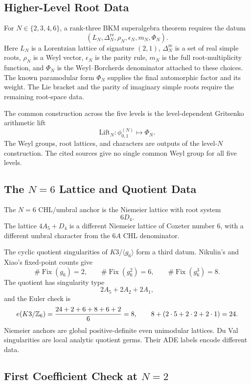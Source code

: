 \subsection*{Higher-Level Root Data}

For \(N\in\{2,3,4,6\}\), a rank-three BKM superalgebra theorem requires
the datum
\[
  (L_N,\Delta^{\mathrm{re}}_N,\rho_N,\epsilon_N,m_N,\Phi_N).
\]
Here \(L_N\) is a Lorentzian lattice of signature \((2,1)\),
\(\Delta^{\mathrm{re}}_N\) is a set of real simple roots,
\(\rho_N\) is a Weyl vector, \(\epsilon_N\) is the parity rule,
\(m_N\) is the full root-multiplicity function, and \(\Phi_N\) is the
Weyl--Borcherds denominator attached to these choices. The known
paramodular form \(\Phi_N\) supplies the final automorphic factor and
its weight. The Lie bracket and the parity of imaginary simple roots
require the remaining root-space data.

The common construction across the five levels is the level-dependent
Gritsenko arithmetic lift
\[
  \mathrm{Lift}_N:\phi^{(N)}_{0,1}\longmapsto \Phi_N .
\]
The Weyl groups, root lattices, and characters are outputs of the
level-\(N\) construction. The cited sources give no single common Weyl
group for all five levels.

\subsection*{The \(N=6\) Lattice and Quotient Data}

The \(N=6\) CHL/umbral anchor is the Niemeier lattice with root system
\[
  6D_4 .
\]
The lattice \(4A_5+D_4\) is a different Niemeier lattice of Coxeter
number \(6\), with a different umbral character from the \(6A\) CHL
denominator.

The cyclic quotient singularities of \(K3/\langle g_6\rangle\) form a
third datum. Nikulin's and Xiao's fixed-point counts give
\[
  \#\operatorname{Fix}(g_6)=2,\qquad
  \#\operatorname{Fix}(g_6^2)=6,\qquad
  \#\operatorname{Fix}(g_6^3)=8.
\]
The quotient has singularity type
\[
  2A_5+2A_2+2A_1,
\]
and the Euler check is
\[
  e(K3/\mathbb{Z}_6)=\frac{24+2+6+8+6+2}{6}=8,\qquad
  8+(2\cdot5+2\cdot2+2\cdot1)=24 .
\]
Niemeier anchors are global positive-definite even unimodular lattices.
Du Val singularities are local analytic quotient germs. Their ADE
labels encode different data.

\subsection*{First Coefficient Check at \(N=2\)}

